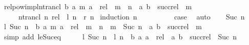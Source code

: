 \begin{isabellebody}
\ relpow{\isacharunderscore}{\kern0pt}impl{\isacharunderscore}{\kern0pt}ntrancl{\isacharcolon}{\kern0pt}\ {\isachardoublequoteopen}{\isacharbraceleft}{\kern0pt}b{\isachardot}{\kern0pt}\ {\isasymexists}a\ m{\isachardot}{\kern0pt}\ a\ {\isasymin}\ rel\ {\isasymand}\ m\ {\isasymle}\ n\ {\isasymand}\ {\isacharparenleft}{\kern0pt}a{\isacharcomma}{\kern0pt}\ b{\isacharparenright}{\kern0pt}\ {\isasymin}\ succ{\isacharunderscore}{\kern0pt}rel\ {\isacharcircum}{\kern0pt}{\isacharcircum}{\kern0pt}\ m{\isacharbraceright}{\kern0pt}\isanewline
\ \ \ \ {\isacharequal}{\kern0pt}\ ntrancl\ n\ rel{\isachardoublequoteclose}\ {\isacharparenleft}{\kern0pt}\ {\isachardoublequoteopen}{\isacharquery}{\kern0pt}l\ n\ {\isacharequal}{\kern0pt}\ {\isacharquery}{\kern0pt}r\ n{\isachardoublequoteclose}{\isacharparenright}{\kern0pt}\isanewline
%
\isadelimproof
%
\endisadelimproof
%
\isatagproof
{}\isamarkupfalse%
\ {\isacharparenleft}{\kern0pt}induction\ n{\isacharparenright}{\kern0pt}\isanewline
\ \ \isamarkupfalse%
\ {}\isanewline
\ \ \isamarkupfalse%
\ \isamarkupfalse%
\ {\isacharquery}{\kern0pt}case\ \isamarkupfalse%
\ auto\isanewline
{}\isamarkupfalse%
\isanewline
\ \ \isamarkupfalse%
\ {\isacharparenleft}{\kern0pt}Suc\ n{\isacharparenright}{\kern0pt}\isanewline
\ \ \isamarkupfalse%
\ {\isachardoublequoteopen}{\isacharquery}{\kern0pt}l\ {\isacharparenleft}{\kern0pt}Suc\ n{\isacharparenright}{\kern0pt}\ {\isacharequal}{\kern0pt}\ {\isacharbraceleft}{\kern0pt}b{\isachardot}{\kern0pt}\ {\isasymexists}a\ m{\isachardot}{\kern0pt}\ a\ {\isasymin}\ rel\ {\isasymand}\ {\isacharparenleft}{\kern0pt}m\ {\isasymle}\ n\ {\isasymor}\ m\ {\isacharequal}{\kern0pt}\ Suc\ n{\isacharparenright}{\kern0pt}\ {\isasymand}\ {\isacharparenleft}{\kern0pt}a{\isacharcomma}{\kern0pt}\ b{\isacharparenright}{\kern0pt}\ {\isasymin}\ succ{\isacharunderscore}{\kern0pt}rel\ {\isacharcircum}{\kern0pt}{\isacharcircum}{\kern0pt}\ m{\isacharbraceright}{\kern0pt}{\isachardoublequoteclose}\ \isamarkupfalse%
\ {\isacharparenleft}{\kern0pt}simp\ add{\isacharcolon}{\kern0pt}\ le{\isacharunderscore}{\kern0pt}Suc{\isacharunderscore}{\kern0pt}eq{\isacharparenright}{\kern0pt}\isanewline
\ \ \isamarkupfalse%
\ \isamarkupfalse%
\ {\isachardoublequoteopen}{\isacharquery}{\kern0pt}l\ {\isacharparenleft}{\kern0pt}Suc\ n{\isacharparenright}{\kern0pt}\ {\isacharequal}{\kern0pt}\ {\isacharquery}{\kern0pt}l\ n\ {\isasymunion}\ {\isacharbraceleft}{\kern0pt}b{\isachardot}{\kern0pt}\ {\isasymexists}a{\isachardot}{\kern0pt}\ a\ {\isasymin}\ rel\ {\isasymand}\ {\isacharparenleft}{\kern0pt}a{\isacharcomma}{\kern0pt}\ b{\isacharparenright}{\kern0pt}\ {\isasymin}\ succ{\isacharunderscore}{\kern0pt}rel\ {\isacharcircum}{\kern0pt}{\isacharcircum}{\kern0pt}\ Suc\ n{\isacharbraceright}{\kern0pt}{\isachardoublequoteclose}\ \isamarkupfalse%

\end{isabellebody}
